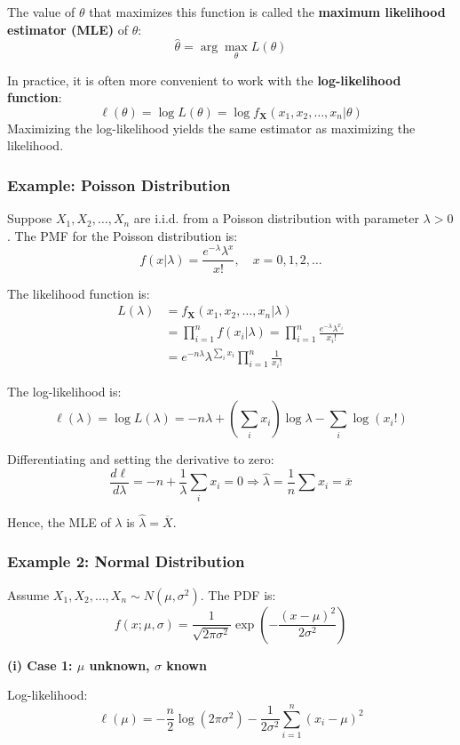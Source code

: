 \documentclass[twoside]{book}
\begin{document}
The value of \( \theta \) that maximizes this function is called the \textbf{maximum likelihood estimator (MLE)} of \( \theta \):
\[
\hat{\theta} = \arg\max_{\theta} L(\theta)
\]

In practice, it is often more convenient to work with the \textbf{log-likelihood function}:
\[
\ell(\theta) = \log L(\theta) = \log f_{\textbf{X}}(x_1, x_2, \dots, x_n | \theta)
\]
Maximizing the log-likelihood yields the same estimator as maximizing the likelihood.

\subsubsection*{Example: Poisson Distribution}

Suppose \( X_1, X_2, \dots, X_n \) are i.i.d. from a Poisson distribution with parameter \( \lambda > 0 \). The PMF for the Poisson distribution is:
\[
f(x | \lambda) = \frac{e^{-\lambda} \lambda^x}{x!}, \quad x = 0, 1, 2, \dots
\]

The likelihood function is:
\begin{align*}
L(\lambda) &= f_{\textbf{X}}(x_1, x_2, \dots, x_n | \lambda)\\
&= \prod_{i=1}^n f(x_i | \lambda) = \prod_{i=1}^n \frac{e^{-\lambda} \lambda^{x_i}}{x_i!} \\
&= e^{-n\lambda} \lambda^{\sum_i x_i} \prod_{i=1}^n \frac{1}{x_i!}
\end{align*}

The log-likelihood is:
\[
\ell(\lambda) = \log L(\lambda) = -n\lambda + \left(\sum_i x_i\right) \log \lambda - \sum_i \log(x_i!)
\]

Differentiating and setting the derivative to zero:
\[
\frac{d\ell}{d\lambda} = -n + \frac{1}{\lambda}\sum_i x_i = 0 \Rightarrow \hat{\lambda}  = \frac{1}{n} \sum x_i = \overline{x}
\]

Hence, the MLE of $\lambda$ is $\hat{\lambda} = \overline{X}$.

\subsubsection*{Example 2: Normal Distribution}

Assume \( X_1, X_2, \dots, X_n \sim N(\mu, \sigma^2) \). The PDF is:
\[
f(x; \mu, \sigma) = \frac{1}{\sqrt{2\pi\sigma^2}} \exp\left( -\frac{(x - \mu)^2}{2\sigma^2} \right)
\]

\textbf{(i) Case 1: \( \mu \) unknown, \( \sigma \) known}

Log-likelihood:
\[
\ell(\mu) = -\frac{n}{2} \log(2\pi\sigma^2) - \frac{1}{2\sigma^2} \sum_{i=1}^n (x_i - \mu)^2
\]
\end{document}
